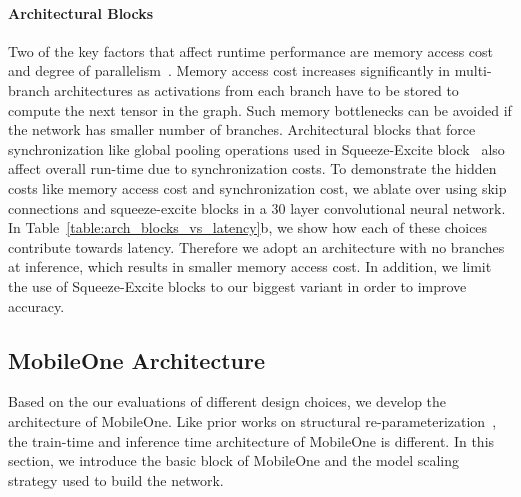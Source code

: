\paragraph{Architectural Blocks}
Two of the key factors that affect runtime performance are memory access cost and degree of parallelism~\cite{Ma_2018_shufflenetv2}. 
Memory access cost increases significantly in multi-branch architectures as activations from each branch have to be stored to compute the next tensor in the graph. 
Such memory bottlenecks can be avoided if the network has smaller number of branches.
Architectural blocks that force synchronization like global pooling operations used in Squeeze-Excite block~\cite{hu2018senet} also affect overall run-time due to synchronization costs.
To demonstrate the hidden costs like memory access cost and synchronization cost, we ablate over using skip connections and squeeze-excite blocks in a 30 layer convolutional neural network. In Table~\ref{table:arch_blocks_vs_latency}b, we show how each of these choices contribute towards latency. Therefore we adopt an architecture with no branches at inference, which results in smaller memory access cost. In addition, we limit the use of Squeeze-Excite blocks to our biggest variant in order to improve accuracy. 

\begin{table}
\centering
{}
    \caption{Ablation on latency of different architectural blocks in a 30-layer convolutional neural network.}\label{table:arch_blocks_vs_latency}
\end{table}

\subsection{MobileOne Architecture}\label{section:arch}
Based on the our evaluations of different design choices, we develop the architecture of MobileOne. Like prior works on structural re-parameterization~\cite{NEURIPS2020_expandnets,Ding_2019_ICCV,Ding_2021_repvgg,ding2021diverse}, the train-time and inference time architecture of MobileOne is different. In this section, we introduce the basic block of MobileOne and the model scaling strategy used to build the network.

